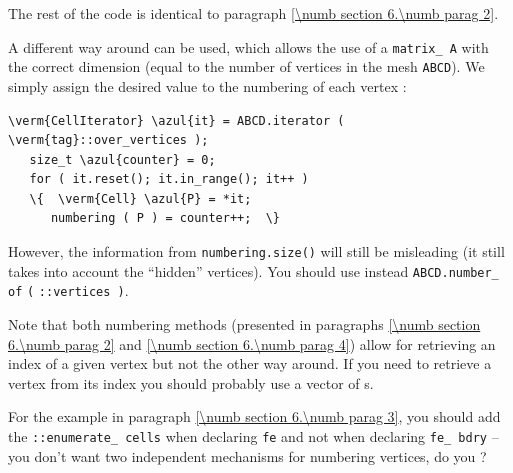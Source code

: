 The rest of the code is identical to paragraph \ref{\numb section 6.\numb parag 2}.

A different way around can be used, which allows the use of a {\small\tt matrix\_\,A}
with the correct dimension (equal to the number of vertices in the mesh {\small\tt ABCD}).
We simply assign the desired value to the numbering of each vertex :

\begin{Verbatim}[commandchars=\\\{\},formatcom=\small\tt,frame=single,
   rulecolor=\color{coment},baselinestretch=0.94,framesep=2mm          ]
   \verm{CellIterator} \azul{it} = ABCD.iterator ( \verm{tag}::over_vertices );
   size_t \azul{counter} = 0;
   for ( it.reset(); it.in_range(); it++ )
   \{  \verm{Cell} \azul{P} = *it;
      numbering ( P ) = counter++;  \}
\end{Verbatim}

However, the information from {\small\tt numbering.size()} will still be misleading
(it still takes into account the ``hidden'' vertices).
You should use instead {\small\tt ABCD.number\_\,of} {\small\tt} {\small\tt (}
{\small\tt {}::vertices )}.

Note that both numbering methods (presented in paragraphs \ref{\numb section 6.\numb parag 2}
and \ref{\numb section 6.\numb parag 4}) allow for retrieving
an index of a given vertex but not the other way around.
If you need to retrieve a vertex from its index you should probably use 
a vector of {\small\tt{}}s.

For the example in paragraph \ref{\numb section 6.\numb parag 3}, you should add the
{\small\tt{}::enumerate\_\,cells} when declaring {\small\tt fe} and not when
declaring {\small\tt fe\_\,bdry} -- you don't want two independent mechanisms for numbering
vertices, do you ?
